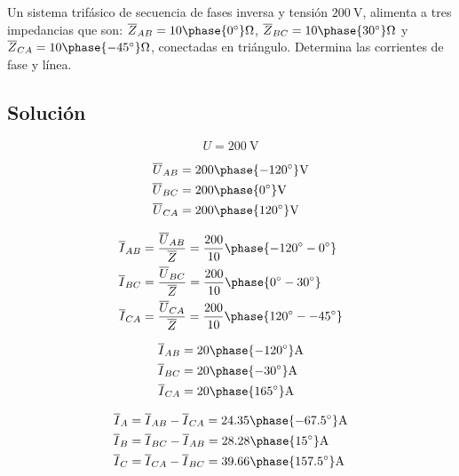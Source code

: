  Un sistema trifásico de secuencia de fases inversa y tensión
 $\SI{200}{\volt}$, alimenta a tres impedancias que son:
 $\overline{Z}_{AB} =
 {10\phase{\ang{0}}}\unit{\ohm}$,
 $\overline{Z}_{BC} =
 {10\phase{\ang{30}}}\unit{\ohm}$ y
 $\overline{Z}_{CA} =
 {10\phase{\ang{-45}}}\unit{\ohm}$, conectadas en
 triángulo. Determina las corrientes de fase y línea.

 \subsection*{Solución}
 
\[
  U = \SI[parse-numbers=false]{200}{\volt}
\]
  
  \begin{align*}
    \overline{U}_{AB} &= {200\phase{\ang{-120}}}\unit{\volt}\\
    \overline{U}_{BC} &= {200\phase{\ang{0}}}\unit{\volt}\\
    \overline{U}_{CA} &= {200\phase{\ang{120}}}\unit{\volt}\\
  \end{align*}

 \begin{align*}
   \overline{I}_{AB} &= \frac{\overline{U}_{AB}}{\overline{Z}} = \frac{200}{10}\phase{\ang{-120} - \ang{0}} \\
   \overline{I}_{BC} &= \frac{\overline{U}_{BC}}{\overline{Z}} = \frac{200}{10}\phase{\ang{0} - \ang{30}}\\
   \overline{I}_{CA} &= \frac{\overline{U}_{CA}}{\overline{Z}} = \frac{200}{10}\phase{\ang{120} - \ang{-45}}
 \end{align*}

  \begin{align*}
    \overline{I}_{AB} &= {20\phase{\ang{-120}}}\unit{\ampere}\\
    \overline{I}_{BC} &= {20\phase{\ang{-30}}}\unit{\ampere}\\
    \overline{I}_{CA} &= {20\phase{\ang{165}}}\unit{\ampere}
  \end{align*}

 \begin{align*}
   \overline{I}_A &= \overline{I}_{AB} - \overline{I}_{CA} = {24.35\phase{\ang{-67.5}}}\unit{\ampere}\\
   \overline{I}_B &= \overline{I}_{BC} - \overline{I}_{AB} = {28.28\phase{\ang{15}}}\unit{\ampere}\\
   \overline{I}_C &= \overline{I}_{CA} - \overline{I}_{BC} = {39.66\phase{\ang{157.5}}}\unit{\ampere}\\
 \end{align*}

